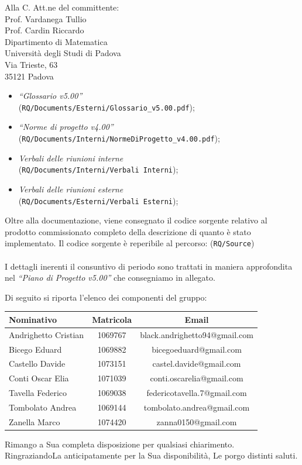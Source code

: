 \documentclass[a4paper,12pt]{letteracdp}
\begin{document}
\begin{letter}{
		Alla C. Att.ne del committente: \\
		Prof. Vardanega Tullio \\
		Prof. Cardin Riccardo \\
		Dipartimento di Matematica \\
		Università degli Studi di Padova \\
		Via Trieste, 63 \\
		35121 Padova}
\begin{itemize}
	\item \textit{“Glossario v5.00”} \\(\texttt{RQ/Documents/Esterni/Glossario\_v5.00.pdf});
	
	\item \textit{“Norme di progetto v4.00”} \\(\texttt{RQ/Documents/Interni/NormeDiProgetto\_v4.00.pdf});

	\item \textit{Verbali delle riunioni interne}	\\(\texttt{RQ/Documents/Interni/Verbali Interni});
	
	\item \textit{Verbali delle riunioni esterne}	\\(\texttt{RQ/Documents/Esterni/Verbali Esterni});
		
\end{itemize}

Oltre alla documentazione, viene consegnato il codice sorgente relativo al prodotto commissionato completo della descrizione di quanto è stato implementato. Il codice sorgente è reperibile al percorso: (\texttt{RQ/Source})
\\\\I dettagli inerenti il consuntivo di periodo sono trattati in maniera approfondita nel \textit{``Piano di Progetto v5.00''} che consegniamo in allegato.

Di seguito si riporta l'elenco dei componenti del gruppo:

\begin{center}
		\begin{tabular}{l c c}
			\toprule
			\textbf{Nominativo} & \textbf{Matricola} & \textbf{Email} \\
			\midrule
			Andrighetto Cristian & 1069767 & black.andrighetto94@gmail.com \\
			Bicego Eduard & 1069882 & bicegoeduard@gmail.com  \\
			Castello Davide	& 1073151 &	 castel.davide@gmail.com\\
			Conti Oscar Elia & 1071039 & conti.oscarelia@gmail.com \\
			Tavella Federico & 1069038 & federicotavella.7@gmail.com\\
			Tombolato Andrea & 1069144 & tombolato.andrea@gmail.com	 \\
			Zanella Marco & 1074420 & zanna0150@gmail.com \\
			\bottomrule
		\end{tabular}
\end{center}
		
		\closing{Rimango a Sua completa disposizione per qualsiasi chiarimento. \\
		RingraziandoLa anticipatamente per la Sua disponibilità, Le porgo distinti saluti.}
		
	\end{letter}
\end{document}
